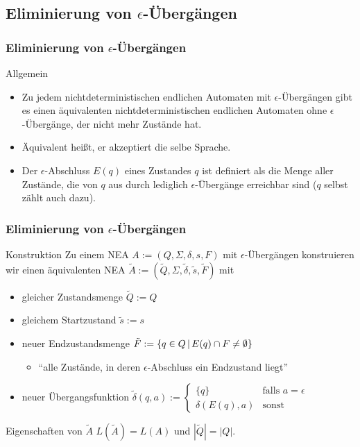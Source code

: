 \subsection{Eliminierung von $\epsilon$-Übergängen}
\begin{frame}
	\frametitle{Eliminierung von $\epsilon$-Übergängen}
	\begin{block}{Allgemein}
	\begin{itemize}
	 \item Zu jedem nichtdeterministischen endlichen Automaten mit $\epsilon$-Übergängen gibt es einen äquivalenten nichtdeterministischen
	 endlichen Automaten ohne $\epsilon$-Übergänge, der nicht mehr Zustände hat.
	 \item Äquivalent heißt, er akzeptiert die selbe Sprache.
	\item Der $\epsilon$-Abschluss $E(q)$ eines Zustandes $q$ ist definiert als die Menge aller Zustände, die von $q$ aus durch lediglich $\epsilon$-Übergänge erreichbar sind ($q$ selbst zählt auch dazu).
	\end{itemize}
	\end{block}
\end{frame}
\begin{frame}
\frametitle{Eliminierung von $\epsilon$-Übergängen}
	\begin{block}{Konstruktion}
	Zu einem NEA \(A := (Q, \Sigma, \delta, s, F)\) mit $\epsilon$-Übergängen konstruieren wir einen 
	  äquivalenten NEA \(\tilde{A} := (\tilde{Q}, \Sigma, \tilde{\delta}, \tilde{s}, \tilde{F})\) mit
	 \begin{itemize}
	 \item gleicher Zustandsmenge \(\tilde{Q} := Q\)
	 \item gleichem Startzustand \(\tilde{s} := s\)
	 \item neuer Endzustandsmenge \(\tilde{F} := \left\lbrace q \in Q \,\middle\vert\, E(q)\cap F \neq \emptyset \right\rbrace\)
	 \begin{itemize}
	 	\item ``alle Zustände, in deren $\epsilon$-Abschluss ein Endzustand liegt''
	 \end{itemize}
	 \item neuer Übergangsfunktion $\tilde{\delta}(q,a) := 
	 \begin{cases}
	  \{q\}			& \text{falls $a = \epsilon$} \\
	 \delta(E(q),a)	& \text{sonst}
	 \end{cases}$
	 \end{itemize}
	\end{block}
	\begin{block}{Eigenschaften von \(\tilde{A}\)}
	 \(L(\tilde{A}) = L(A)\) und \(|\tilde{Q}| = |Q|\).
	\end{block}

\end{frame}

